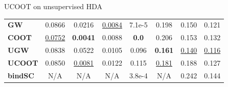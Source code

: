 \documentclass{beamer}
\begin{document}
\begin{frame}{UCOOT on unsupervised HDA}
\begin{table}[t]
\begin{center}
{\begin{tabular}{lccccccc}
    \multicolumn{1}{l|}{\textbf{GW}}     & 0.0866                                                          & 0.0216                                                         & {\underline{0.0084}}                                                   & 7.1e-5                                                                         & 0.198                                                       & 0.150                                                             & 0.121                                                         \\
    \multicolumn{1}{l|}{\textbf{COOT}}   & {\underline{0.0752}}                                                    & \textbf{0.0041}                                                & 0.0088                                                         & \textbf{0.0}                                                                   & 0.206                                                       & 0.153                                                             & 0.132                                                         \\
    \multicolumn{1}{l|}{\textbf{UGW}}    & 0.0838                                                          & 0.0522                                                         & 0.0105                                                         & 0.096                                                                          & \textbf{0.161}                                              & {\underline{0.140}}                                                       & {\underline{0.116}}                                                   \\
    \multicolumn{1}{l|}{\textbf{UCOOT}}  & 0.0850                                                          & {\underline{0.0081}}                                                   & 0.0122                                                         & 0.115                                                                          & {\underline{0.181}}                                                 & 0.188                                                             & 0.127                                                         \\
    \multicolumn{1}{l|}{\textbf{bindSC}} & N/A                                                             & N/A                                                            & N/A                                                            & 3.8e-4                                                                         & N/A                                                         & 0.242                                                             & 0.144                                                         \\ \hline

\end{tabular}}
\end{center}
\end{table}
\end{frame}
\end{document}

